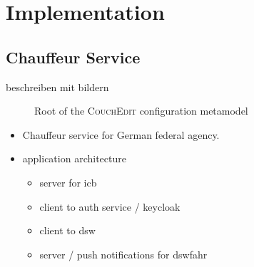\chapter{Implementation}


\section{Chauffeur Service}
 beschreiben mit bildern


 \begin{figure}[ht]
  \centering
  
  \caption{Root of the \textsc{CouchEdit} configuration metamodel}
  \label{fig:metamodel-base}
  \end{figure}


 \begin{itemize}
    \item Chauffeur service for German federal agency.
    
    \item application architecture
        \begin{itemize}
            \item server for icb
            \item client to auth service / keycloak
            \item client to dsw
            \item server / push notifications for dswfahr 
        \end{itemize}
 \end{itemize}